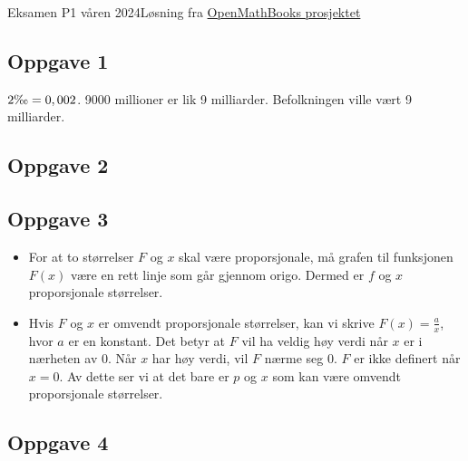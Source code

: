 





{\Large Eksamen P1 våren 2024\hfill {\footnotesize Løsning fra \color{blue} \href{https://sindreheggen.wordpress.com/}{OpenMathBooks prosjektet}}}	
\subsection*{Oppgave 1}
$ 2\text{\textperthousand}=0,002 $.
9000 millioner er lik 9 milliarder. Befolkningen ville vært 9 milliarder.

\subsection*{Oppgave 2}

\subsection*{Oppgave 3}
\begin{itemize}
	\item For at to størrelser $ F $ og $ x $ skal være proporsjonale, må grafen til funksjonen $ F(x) $ være en rett linje som går gjennom origo. Dermed er $ f $ og $ x $ proporsjonale størrelser.
	\item Hvis $ F $ og $ x $ er omvendt proporsjonale størrelser, kan vi skrive $ F(x)=\frac{a}{x} $, hvor $ a $ er en konstant. Det betyr at $ F $ vil ha veldig høy verdi når $ x $ er i nærheten av 0. Når $ x $ har høy verdi, vil $ F $ nærme seg 0. $ F $ er ikke definert når $ x=0 $. Av dette ser vi at det bare er $ p $ og $ x $ som kan være omvendt proporsjonale størrelser.
\end{itemize}

\newpage
\subsection*{Oppgave 4}

